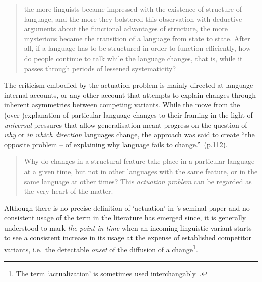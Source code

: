 \begin{quote}
the more linguists became impressed with the existence of structure of language, and the more they bolstered this observation with deductive arguments about the functional advantages of structure, the more mysterious became the transition of a language from state to state. After all, if a language has to be structured in order to function efficiently, how do people continue to talk while the language changes, that is, while it passes through periods of lessened systematicity?~\citep[p.100]{Weinreich1968}
\end{quote}

The criticism embodied by the actuation problem is mainly directed at language-internal accounts, or any other account that attempts to explain changes through inherent asymmetries between competing variants.
While the move from the (over-)explanation of particular language changes to their framing in the light of \emph{universal} pressures that allow generalisation meant progress on the question of \emph{why} or \emph{in which direction} languages change, the approach was said to create ``the opposite problem -- of explaining why language fails to change.''~(p.112).

\begin{quote}
Why do changes in a structural feature take place in a particular language at a given time, but not in other languages with the same feature, or in the same language at other times? This \emph{actuation problem} can be regarded as the very heart of the matter.~\citep[p.102]{Weinreich1968}
\end{quote}

Although there is no precise definition of `actuation' in \citeauthor{Weinreich1968}'s seminal paper and no consistent usage of the term in the literature has emerged since, it is generally understood to mark \emph{the point in time} when an incoming linguistic variant starts to see a consistent increase in its usage at the expense of established competitor variants, i.e.~the detectable \emph{onset} of the diffusion of a change\footnote{The term `actualization' \citep[with a specific meaning in grammaticalisation theory, see][p.24]{Traugott2011} is sometimes used interchangably~\citep{Andersen2008,Kiparsky2014}.}.


